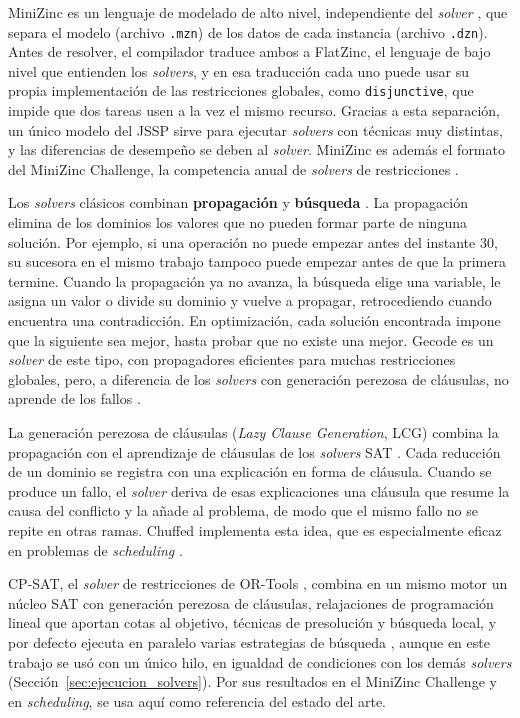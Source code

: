 MiniZinc es un lenguaje de modelado de alto nivel, independiente del
\textit{solver} \citep{nethercote2007}, que separa el modelo (archivo
\texttt{.mzn}) de los datos de cada instancia (archivo \texttt{.dzn}). Antes
de resolver, el compilador traduce ambos a FlatZinc, el lenguaje de bajo nivel
que entienden los \textit{solvers}, y en esa traducción cada uno puede usar su
propia implementación de las restricciones globales, como
\texttt{disjunctive}, que impide que dos tareas usen a la vez el mismo
recurso. Gracias a esta separación, un único modelo del JSSP sirve para
ejecutar \textit{solvers} con técnicas muy distintas, y las diferencias de
desempeño se deben al \textit{solver}. MiniZinc es además el formato del
MiniZinc Challenge, la competencia anual de \textit{solvers} de restricciones
\citep{stuckey2014}.

Los \textit{solvers} clásicos combinan \textbf{propagación} y
\textbf{búsqueda} \citep{rossi2006}. La propagación elimina de los dominios
los valores que no pueden formar parte de ninguna solución. Por ejemplo, si
una operación no puede empezar antes del instante 30, su sucesora en el mismo
trabajo tampoco puede empezar antes de que la primera termine. Cuando la
propagación ya no avanza, la búsqueda elige una variable, le asigna un valor
o divide su dominio y vuelve a propagar, retrocediendo cuando encuentra una
contradicción. En optimización, cada solución encontrada impone que la
siguiente sea mejor, hasta probar que no existe una mejor. Gecode
\citep{gecode2019} es un \textit{solver} de este tipo, con propagadores
eficientes para muchas restricciones globales, pero, a diferencia de los
\textit{solvers} con generación perezosa de cláusulas, no aprende de los
fallos \citep{chu2011}.

La generación perezosa de cláusulas (\textit{Lazy Clause Generation}, LCG)
combina la propagación con el aprendizaje de cláusulas de los
\textit{solvers} SAT \citep{ohrimenko2009}. Cada reducción de un dominio se
registra con una explicación en forma de cláusula. Cuando se produce un fallo,
el \textit{solver} deriva de esas explicaciones una cláusula que resume la
causa del conflicto y la añade al problema, de modo que el mismo fallo no se
repite en otras ramas. Chuffed \citep{chu2011} implementa esta idea, que es
especialmente eficaz en problemas de \textit{scheduling}
\citep{schutt2011}.

CP-SAT, el \textit{solver} de restricciones de OR-Tools \citep{perron2025},
combina en un mismo motor un núcleo SAT con generación perezosa de cláusulas,
relajaciones de programación lineal que aportan cotas al objetivo, técnicas
de presolución y búsqueda local, y por defecto ejecuta en paralelo varias
estrategias de búsqueda \citep{perron2023}, aunque en este trabajo se usó con un único hilo, en
igualdad de condiciones con los demás \textit{solvers}
(Sección~\ref{sec:ejecucion_solvers}). Por sus resultados en el MiniZinc
Challenge y en \textit{scheduling}, se usa aquí como referencia del estado
del arte.

